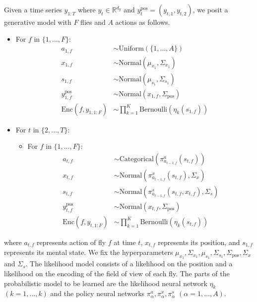 \documentclass{article}
\begin{document}
Given a time series $y_{1:T}$ where $y_t \in \mathbb R^{d_y}$ and $y_t^{\text{pos}} = (y_{t, 1}, y_{t, 2})$, we posit a generative model with $F$ flies and $A$ actions as follows.
\begin{itemize}
    \item For $f$ in $\{1, \dotsc, F\}$:
    \begin{align}
        a_{1, f} &\sim \mathrm{Uniform}(\{1, \dotsc, A\}) \\
        x_{1, f} &\sim \mathrm{Normal}(\mu_{x_1}, \Sigma_{x_1}) \\
        s_{1, f} &\sim \mathrm{Normal}(\mu_{s_1}, \Sigma_{s_1}) \\
        y_{1, f}^{\text{pos}} &\sim \mathrm{Normal}(x_{1, f}, \Sigma_{\text{pos}}) \\
        \mathrm{Enc}(f, y_{1, 1:F}) &\sim \prod_{k = 1}^K \mathrm{Bernoulli}(\eta_k(s_{1, f}))
    \end{align}
    \item For $t$ in $\{2, \dotsc, T\}$:
    \begin{itemize}
        \item For $f$ in $\{1, \dotsc, F\}$:
        \begin{align}
            a_{t, f} &\sim \mathrm{Categorical}(\pi_{a_{t - 1, f}}^a(s_{t, f})) \\
            x_{t, f} &\sim \mathrm{Normal}(\pi_{a_{t - 1, f}}^x(s_{t, f}), \Sigma_x) \\
            s_{t, f} &\sim \mathrm{Normal}(\pi_{a_{t - 1, f}}^s(s_{t, f}, x_{t, f}), \Sigma_s) \\
            y_{t, f}^{\text{pos}} &\sim \mathrm{Normal}(x_{t, f}, \Sigma_{\text{pos}}) \\
            \mathrm{Enc}(f, y_{t, 1:F}) &\sim \prod_{k = 1}^K \mathrm{Bernoulli}(\eta_k(s_{t, f}))
        \end{align}
    \end{itemize}
\end{itemize}
where $a_{t, f}$ represents action of fly $f$ at time $t$, $x_{t, f}$ represents its position, and $s_{1, f}$ represents its mental state.
We fix the hyperparameters $\mu_{x_1}, \Sigma_{x_1}, \mu_{s_1}, \Sigma_{s_1}, \Sigma_{\text{pos}}, \Sigma_x$ and $\Sigma_s$.
The likelihood model consists of a likelihood on the position and a likelihood on the encoding of the field of view of each fly.
The parts of the probabilistic model to be learned are the likelihood neural network $\eta_k$ $(k = 1, \dotsc, k)$ and the policy neural networks $\pi_\alpha^a, \pi_\alpha^x, \pi_\alpha^s$ $(\alpha = 1, \dotsc, A)$.
\end{document}

